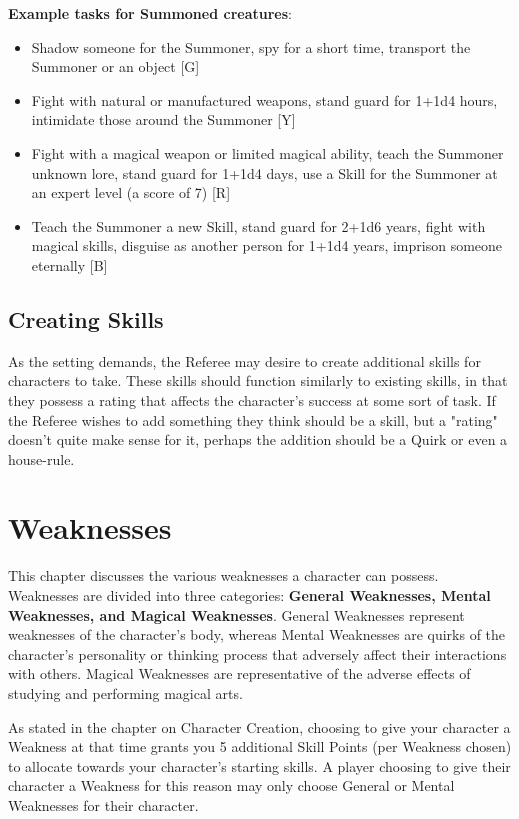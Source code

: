 \documentclass[oneside]{book}
\begin{document}
\begin{multicols}{2}
\textbf{Example tasks for Summoned creatures}: 
	\begin{itemize}
		\setlength{\itemsep}{0cm}%
  		\setlength{\parskip}{0cm}%
		\item{ \small Shadow someone for the Summoner, spy for a short time, transport the Summoner or an object [G]}
		\item{ \small Fight with natural or manufactured weapons, stand guard for 1+1d4 hours, intimidate those around the Summoner  [Y]}
		\item{ \small Fight with a magical weapon or limited magical ability, teach the Summoner unknown lore, stand guard for 1+1d4 days, use a Skill for the Summoner at an expert level (a score of 7) [R]}
		\item{ \small Teach the Summoner a new Skill, stand guard for 2+1d6 years, fight with magical skills, disguise as another person for 1+1d4 years, imprison someone eternally  [B]}
	\end{itemize}

\section{Creating Skills}
As the setting demands, the Referee may desire to create additional skills for characters to take. 
These skills should function similarly to existing skills, in that they  possess a rating that affects the character's success
at some sort of task. If the Referee wishes to add something they think should be a skill, but a "rating" doesn't quite make sense for it,
perhaps the addition should be a Quirk or even a house-rule. 

\end{multicols}

\chapter{Weaknesses}

This chapter discusses the various weaknesses a character can possess. Weaknesses are divided into three categories: \textbf{General Weaknesses, Mental Weaknesses, and Magical Weaknesses}. General Weaknesses represent weaknesses of the character's body, whereas Mental Weaknesses are quirks of the character's personality or thinking process that adversely affect their interactions with others. Magical Weaknesses are representative of the adverse effects of studying and performing magical arts.

As stated in the chapter on Character Creation, choosing to give your character a Weakness at that time grants you 5 additional Skill Points (per Weakness chosen) to allocate towards your character's starting skills. A player choosing to give their character a Weakness for this reason may only choose General or Mental Weaknesses for their character. 
\end{document}
